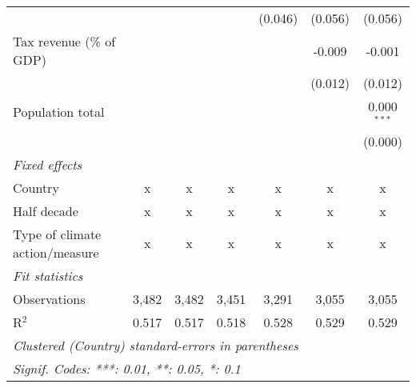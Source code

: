 \begin{tabular}{lcccccc}
                                                      &         &               &                & (0.046)        & (0.056)        & (0.056)\\   
   Tax revenue (\% of GDP)                            &         &               &                &                & -0.009         & -0.001\\   
                                                      &         &               &                &                & (0.012)        & (0.012)\\   
   Population total                                   &         &               &                &                &                & 0.000$^{***}$\\   
                                                      &         &               &                &                &                & (0.000)\\   
   \emph{Fixed effects}\\
   Country                                            & x       & x             & x              & x              & x              & x\\  
   Half decade                                        & x       & x             & x              & x              & x              & x\\  
   Type of climate action/measure                     & x       & x             & x              & x              & x              & x\\  
   \midrule \emph{Fit statistics}\\
   Observations                                       & 3,482   & 3,482         & 3,451          & 3,291          & 3,055          & 3,055\\  
   R$^2$                                              & 0.517   & 0.517         & 0.518          & 0.528          & 0.529          & 0.529\\  
   \midrule
   \multicolumn{7}{l}{\emph{Clustered (Country) standard-errors in parentheses}}\\
   \multicolumn{7}{l}{\emph{Signif. Codes: ***: 0.01, **: 0.05, *: 0.1}}\\
\end{tabular}
\par\endgroup


